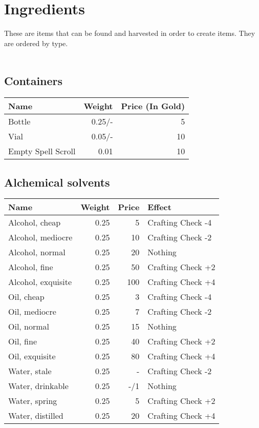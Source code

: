 \section{Ingredients}
These are items that can be found and harvested in order to create items. They are ordered by type.\\
\\
\subsection{Containers}
\begin{longtable}{l | r | r}
	Name & Weight & Price (In Gold)\\ \hline
	Bottle & 0.25/- & 5\\
	Vial & 0.05/- & 10\\
	Empty Spell Scroll & 0.01 & 10\\
\end{longtable}


\subsection{Alchemical solvents}
\begin{longtable}{l | r | r | l}
	Name & Weight & Price & Effect\\ \hline
	Alcohol, cheap & 0.25 & 5 & Crafting Check -4\\
	Alcohol, mediocre & 0.25 & 10 & Crafting Check -2\\
	Alcohol, normal & 0.25 & 20 & Nothing\\
	Alcohol, fine & 0.25 & 50 & Crafting Check +2\\
	Alcohol, exquisite & 0.25 & 100 & Crafting Check +4\\
	Oil, cheap & 0.25 & 3 & Crafting Check -4\\
	Oil, mediocre & 0.25 & 7 & Crafting Check -2\\
	Oil, normal & 0.25 & 15 & Nothing\\
	Oil, fine & 0.25 & 40 & Crafting Check +2\\
	Oil, exquisite & 0.25 & 80 & Crafting Check +4\\
	Water, stale & 0.25 & - & Crafting Check -2\\
	Water, drinkable & 0.25 & -/1 & Nothing\\
	Water, spring & 0.25 & 5 & Crafting Check +2\\
	Water, distilled & 0.25 & 20 & Crafting Check +4\\
\end{longtable}


